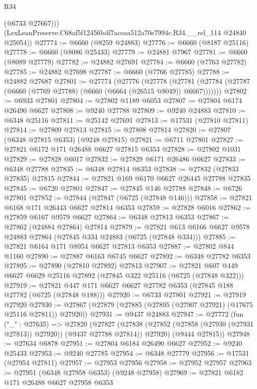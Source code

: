 \begin{lexlean}{R34}
\begin{coremodule}
          (@6733 @27667)))
      (LexLeanPreserve.C68af5f12456bdf7aceaa512a70e7994c.R34.__rel_114 @24840 @25054))
@27774 := @6660 (@8259 @24883)
@27776 := @6660 (@8187 @25116)
@27778 := @6660 (@8086 @25433)
@27779 := @24881 @7967
@27781 := @6660 (@8089 @27779)
@27782 := @24882 @27691
@27784 := @6660 (@7763 @27782)
@27785 := @24882 @27698
@27787 := @6660 (@7766 @27785)
@27788 := @24882 @27687
@27801 := @27774
    (@27776
      (@27778
        (@27781 (@27784 (@27787 (@6660 (@7769 @27788) (@6660 (@6664 (@26515 @8049)) @6667)))))))
@27802 := @6933 @27801
@27804 := @27802 @1189 @6053
@27807 := @27804 @6174 @26490 @6627
@27808 := @9240 @27788
@27809 := @9240 @24883
@27810 := @6348 @25116
@27811 := @25142 @27691
@27813 := @17531 (@27810 @27811)
@27814 := @27809 @27813
@27815 := @27808 @27814
@27820 := @27807 (@6348 @27815 @6353) (@9248 @27815)
@27821 := @6711 @27801
@27827 := @27821 @6172 @171 @26488 @6627 @27815 @6353
@27828 := @27802 @1031
@27829 := @27828 @6017
@27832 := @27829 @6171 @26486 @6627
@27833 := @6348 @27788
@27835 := @6348 @27814 @6353
@27838 := @27832 (@27833 @27835) @27815
@27844 := @27821 @169 @6170 @6627 @26445 @27788 @27835
@27845 := @6720 @27801
@27847 := @27845 @146 @27788
@27848 := @6726 @27801
@27852 := @27844 (@27847 (@6725 (@27848 @146)))
@27858 := @27821 @6168 @171 @26443 @6627 @27814 @6353
@27859 := @27828 @6016
@27862 := @27859 @6167 @9579 @6627
@27864 := @6348 @27813 @6353
@27867 := @27862 (@24884 @27864) @27814
@27879 := @27821 @613 @6166 @6627 @9578 @24883 @27864 (@27845 @334 @24883 (@6725 (@27848 @334)))
@27885 := @27821 @6164 @171 @8954 @6627 @27813 @6353
@27887 := @27802 @844 @1160
@27890 := @27887 @6163 @6745 @6627
@27892 := @6348 @27782 @6353
@27895 := @27890 (@27810 @27892) @27813
@27907 := @27821 @607 @449 @6627 @6629 @25116 @27892 (@27845 @322 @25116 (@6725 (@27848 @322)))
@27919 := @27821 @447 @171 @6627 @6627 @27782 @6353 (@27845 @188 @27782 (@6725 (@27848 @188)))
@27920 := @6733 @27801
@27921 := @27919 @27920
@27930 := @27867 (@27879 (@27885 (@27895 (@27907 @27921) (@17675 @25116 @27811)) @27920))
@27931 := @9437 @24883
@27947 := @27772
    (fun ("_" : @27635) =>
    @27820
      (@27827
        (@27838 (@27852 (@27858 (@27930 (@27931 @27813)) @27920)) (@9437 @27788 @27814))
        @27920)
      (@9444 @27815))
@27948 := @27634 @6878
@27951 := @27804 @6184 @26490 @6627
@27952 := @9240 @25433
@27953 := @9240 @27785
@27954 := @6348 @27779
@27956 := @17531 (@27954 @27811)
@27957 := @27953 @27956
@27958 := @27952 @27957
@27963 := @27951 (@6348 @27958 @6353) (@9248 @27958)
@27969 := @27821 @6182 @171 @26488 @6627 @27958 @6353

\end{coremodule}
\end{lexlean}
